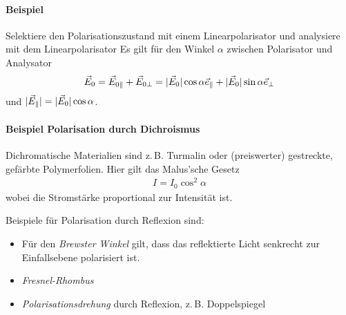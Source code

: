 \paragraph{Beispiel} Selektiere den Polarisationszustand mit einem
Linearpolarisator und analysiere mit dem Linearpolarisator
Es gilt für den Winkel $\alpha$ zwischen Polarisator und Analysator
\begin{gather*}
  \vec{E}_0 = \vec{E}_{0\parallel} + \vec{E}_{0\bot} 
  = |\vec{E}_0|\cos\alpha \vec{e}_\parallel
  + |\vec{E}_0|\sin\alpha \vec{e}_\bot
\end{gather*}
und $|\vec{E}_\parallel| = |\vec{E}_0|\cos\alpha$.

\paragraph{Beispiel Polarisation durch Dichroismus}
Dichromatische Materialien sind z.\,B. Turmalin oder (preiswerter)
gestreckte, gefärbte Polymerfolien.
Hier gilt das Malus'sche Gesetz
\begin{gather*}
  I=I_0\cos^2\alpha
\end{gather*}
wobei die Stromstärke proportional zur Intensität ist.


Beispiele für Polarisation durch Reflexion sind:
\begin{itemize}
\item Für den \emph{Brewster Winkel} gilt, dass das reflektierte Licht senkrecht
zur Einfallsebene polarisiert ist.
\item \emph{Fresnel-Rhombus}
\item \emph{Polarisationsdrehung} durch Reflexion, z.\,B. Doppelspiegel
\end{itemize}


